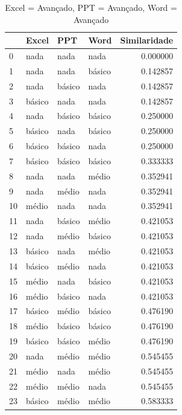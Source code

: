 \documentclass[]{article}
\begin{document}
	
	\begin{longtable}{|llll|r|} 
		\caption{Excel = Avançado, PPT = Avançado, Word = Avançado}
		\label{variability_impl_mech}
		\endfirsthead
		\endhead
		
		\hline
		{} & Excel     & PPT       & Word      & Similaridade \\
		\hline
		0  & nada      & nada      & nada      & 0.000000     \\
		1  & nada      & nada      & básico   & 0.142857     \\
		2  & nada      & básico   & nada      & 0.142857     \\
		3  & básico   & nada      & nada      & 0.142857     \\
		4  & nada      & básico   & básico   & 0.250000     \\
		5  & básico   & nada      & básico   & 0.250000     \\
		6  & básico   & básico   & nada      & 0.250000     \\
		7  & básico   & básico   & básico   & 0.333333     \\
		8  & nada      & nada      & médio    & 0.352941     \\
		9  & nada      & médio    & nada      & 0.352941     \\
		10 & médio    & nada      & nada      & 0.352941     \\
		11 & nada      & básico   & médio    & 0.421053     \\
		12 & nada      & médio    & básico   & 0.421053     \\
		13 & básico   & nada      & médio    & 0.421053     \\
		14 & básico   & médio    & nada      & 0.421053     \\
		15 & médio    & nada      & básico   & 0.421053     \\
		16 & médio    & básico   & nada      & 0.421053     \\
		17 & básico   & médio    & básico   & 0.476190     \\
		18 & médio    & básico   & básico   & 0.476190     \\
		19 & básico   & básico   & médio    & 0.476190     \\
		20 & nada      & médio    & médio    & 0.545455     \\
		21 & médio    & nada      & médio    & 0.545455     \\
		22 & médio    & médio    & nada      & 0.545455     \\
		23 & básico   & médio    & médio    & 0.583333     \\

\end{longtable}
\end{document}
